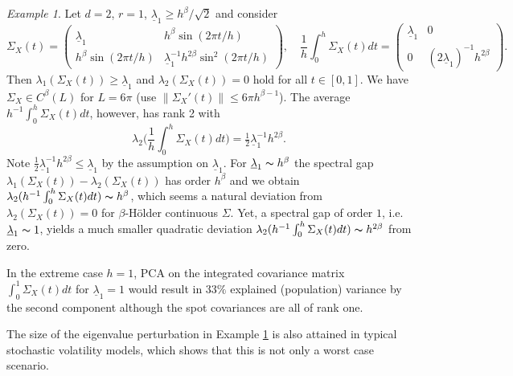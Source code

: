 \documentclass[preprint,aos]{imsart}
\numberwithin{equation}{section}
\theoremstyle{remark}
\newtheorem{example}[satz]{Example}
\providecommand{\abs}[1]{\lvert #1 \rvert}
\providecommand{\norm}[1]{\lVert #1 \rVert}
\renewcommand{\le}{\leqslant}
\renewcommand{\ge}{\geqslant}
\begin{document}
\begin{example}\label{ExRank}
 Let $d=2$, $r=1$, $\underline\lambda_1\ge  h^\beta/\sqrt 2$ and consider
\[ \Sigma_X(t)=\begin{pmatrix} \underline\lambda_1 & h^\beta \sin(2\pi t/h)\\ h^\beta \sin(2\pi t/h) & \underline\lambda_1^{-1}h^{2\beta}\sin^2(2\pi t/h)\end{pmatrix},\quad  \frac1h\int_0^h\Sigma_X(t)dt=\begin{pmatrix} \underline\lambda_1 & 0\\ 0 & (2\underline\lambda_1)^{-1}h^{2\beta}\end{pmatrix}.
\]
Then $\lambda_1(\Sigma_X(t))\ge \underline\lambda_1$ and $\lambda_2(\Sigma_X(t))=0$ hold for all $t\in[0,1]$.
We have $\Sigma_X\in C^\beta(L)$ for $L=6\pi$ (use
$\norm{\Sigma_X'(t)}
\le 6\pi h^{\beta-1}$). The average $h^{-1}\int_0^h\Sigma_X(t)dt$, however,
has rank 2 with
\[\lambda_{2}\Big(\frac1h\int_0^h\Sigma_X(t)dt\Big)=\tfrac12 \underline\lambda_1^{-1}h^{2\beta}.
\]
Note $\frac12 \underline\lambda_1^{-1}h^{2\beta}\le\underline\lambda_1$ by the assumption on $\underline\lambda_1$.
For $\underline\lambda_1\thicksim h^\beta$ the spectral gap $\lambda_1(\Sigma_X(t))-\lambda_2(\Sigma_X(t))$ has order $h^\beta$ and we obtain $\lambda_{2}(h^{-1}\int_0^h\Sigma_X(t)dt)\thicksim h^\beta$, which seems a natural deviation from $\lambda_2(\Sigma_X(t))=0$ for $\beta$-H\"older continuous $\Sigma$. Yet, a spectral gap of order $1$, i.e. $\underline\lambda_1\thicksim  1$, yields a much smaller quadratic deviation $\lambda_{2}(h^{-1}\int_0^h\Sigma_X(t)dt)\thicksim h^{2\beta}$ from zero.

In the extreme case $h=1$, PCA on the integrated covariance matrix $\int_0^1\Sigma_X(t)dt$ for $\underline\lambda_1=1$ would result in $33\%$ explained (population) variance by the second component although the spot covariances are all of rank one.
\end{example}

The  size of the eigenvalue perturbation in Example \ref{ExRank} is also attained in typical stochastic volatility models, which shows that this is not only  a worst case scenario.
\end{document}

